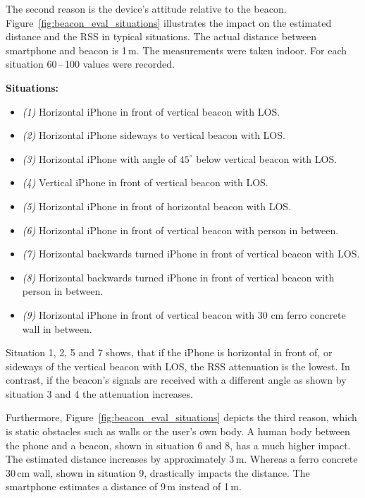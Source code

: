 The second reason is the device's attitude relative to the beacon. Figure~\ref{fig:beacon_eval_situations} illustrates the impact on the estimated distance and the \ac{RSS} in typical situations. The actual distance between smartphone and beacon is 1\,m. The measurements were taken indoor. For each situation 60\,--\,100 values were recorded.\newline

\textbf{Situations:}
\begin{itemize}
  \item \emph{(1)} Horizontal iPhone in front of vertical beacon with \acs{LOS}.
  \item \emph{(2)} Horizontal iPhone sideways to vertical beacon with \acs{LOS}.
  \item \emph{(3)} Horizontal iPhone with angle of $45^\circ$ below vertical beacon with \acs{LOS}.
  \item \emph{(4)} Vertical iPhone in front of vertical beacon with \acs{LOS}.
  \item \emph{(5)} Horizontal iPhone in front of horizontal beacon with \acs{LOS}.
  \item \emph{(6)} Horizontal iPhone in front of vertical beacon with person in between.
  \item \emph{(7)} Horizontal backwards turned iPhone in front of vertical beacon with \acs{LOS}.
  \item \emph{(8)} Horizontal backwards turned iPhone in front of vertical beacon with person in between.
  \item \emph{(9)} Horizontal iPhone in front of vertical beacon with 30 cm ferro concrete wall in between.
\end{itemize}

\noindent Situation 1, 2, 5 and 7 shows, that if the iPhone is horizontal in front of, or sideways of the vertical beacon with \acs{LOS}, the \acs{RSS} attenuation is the lowest. In contrast, if the beacon's signals are received with a different angle as shown by situation 3 and 4 the attenuation increases.

Furthermore, Figure~\ref{fig:beacon_eval_situations} depicts the third reason, which is static obstacles such as walls or the user's own body. A human body between the phone and a beacon, shown in situation 6 and 8, has a much higher impact. The estimated distance increases by approximately 3\,m. Whereas a ferro concrete 30\,cm wall, shown in situation 9, drastically impacts the distance. The smartphone estimates a distance of 9\,m instead of 1\,m.

